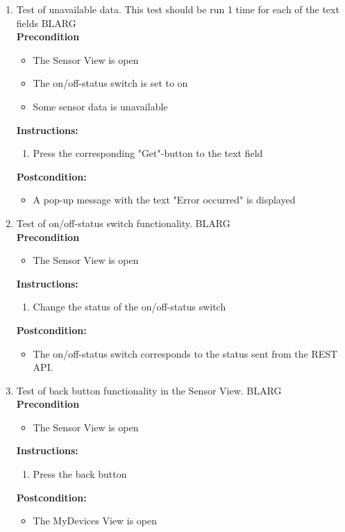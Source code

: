 \documentclass[a4paper]{article}
\newlength{\testlabellength}
\newenvironment{testlist}{\begin{enumerate}[label=\bfseries Instruction \thesubsection.\arabic* , labelindent=0pt, labelwidth=\testlabellength , leftmargin=2cm]}{\end{enumerate}}
\newenvironment{precondition}{
{\color{white}BLARG}\\ 
\textbf{Precondition}
\begin{itemize}[labelindent=0cm, labelwidth=2cm , leftmargin=1cm]
}
{\end{itemize}}
\newenvironment{instruction}{
\textbf{Instructions:}
\begin{enumerate}[label=\bfseries  \arabic*., labelindent=0cm, labelwidth=2cm , leftmargin=1cm]
}
{\end{enumerate}}
\newenvironment{postcondition}{
\textbf{Postcondition:}
\begin{itemize}[labelindent=0cm, labelwidth=2cm , leftmargin=1cm]
}
{\end{itemize}}
\begin{document}
\begin{appendices}
\begin{testlist}
	\item Test of unavailable data. \newline This test should be run 1 time for each of the text fields
		\begin{precondition}
			\item The Sensor View is open
			\item The on/off-status switch is set to on
			\item Some sensor data is unavailable
		\end{precondition}
		\begin{instruction}
			\item Press the corresponding "Get"-button to the text field
    	\end{instruction}
    	\begin{postcondition}
    		\item A pop-up message with the text "Error occurred" is displayed
    	\end{postcondition}

	\item Test of on/off-status switch functionality.
		\begin{precondition}
			\item The Sensor View is open
		\end{precondition}
		\begin{instruction}
			\item Change the status of the on/off-status switch
		\end{instruction}
		\begin{postcondition}
			\item The on/off-status switch corresponds to the status sent from the REST API.
		\end{postcondition}


	\item Test of back button functionality in the Sensor View.
		\begin{precondition}
			\item The Sensor View is open
		\end{precondition}
		\begin{instruction}
			\item Press the back button
		\end{instruction}
		\begin{postcondition}
			\item The MyDevices View is open
		\end{postcondition}


\end{testlist}
\end{appendices}
\end{document}
